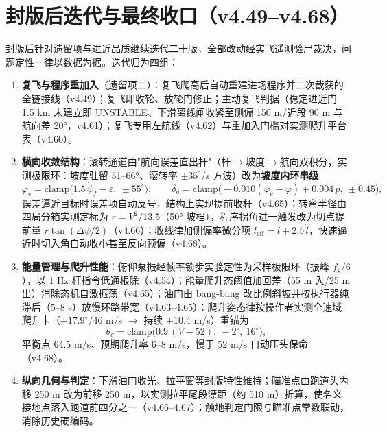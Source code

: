 \documentclass[12pt,UTF8,a4paper]{ctexart}
\begin{document}
\section{封版后迭代与最终收口（v4.49--v4.68）}
封版后针对遗留项与进近品质继续迭代二十版，全部改动经实飞遥测验尸裁决，问题定性一律以数据为据。迭代归为四组：
\begin{enumerate}
\item \textbf{复飞与程序重加入}（遗留项二）：复飞爬高后自动重建进场程序并二次截获的全链接线（v4.49）；复飞即收轮、放轮门修正；主动复飞判据（稳定进近门 1.5 km 未建立即 UNSTABLE、下滑离线闸收紧至侧偏 150 m/近段 90 m 与航向差 20°，v4.61）；复飞专用左航线（v4.62）与重加入门槛对实测爬升平台表（v4.60）。
\item \textbf{横向收敛结构}：滚转通道由"航向误差直出杆"（杆$\to$坡度$\to$航向双积分，实测极限环：坡度驻留 51--66°、滚转率 $\pm35^\circ$/s 方波）改为\textbf{坡度内环串级}
\begin{equation}
\varphi_c=\mathrm{clamp}\!\bigl(1.5\,\dot\psi_f-\varepsilon,\ \pm55^\circ\bigr),\qquad
\delta_a=\mathrm{clamp}\!\bigl(-0.010(\varphi_c-\varphi)+0.004\,p,\ \pm0.45\bigr),
\end{equation}
误差逼近目标时误差项自动反号，结构上实现提前收杆（v4.65）；转弯半径由四局分箱实测定标为 $r=V^2/13.5$（50° 坡档），程序拐角进一触发改为切点提前量 $r\tan(\Delta\psi/2)$（v4.66）；收线律加侧偏率微分项 $l_{\mathrm{eff}}=l+2.5\,\dot l$，快速逼近时切入角自动收小甚至反向预偏（v4.68）。
\item \textbf{能量管理与爬升性能}：俯仰泵振经帧率锁步实验定性为采样极限环（振峰 $f_s/6$），以 1 Hz 杆指令低通根除（v4.54）；能量爬升态阈值加回差（55 m 入/25 m 出）消除态机自激振荡（v4.65）；油门由 bang-bang 改比例斜坡并按执行器纯滞后（5--8 s）放慢环路带宽（v4.63--4.65）；爬升姿态律按操作者实测全速域爬升卡（$+17.9^\circ$/46 m/s $\to$ 持续 $+10.4$ m/s）重锚为
\begin{equation}
\theta_c=\mathrm{clamp}\!\bigl(0.9\,(V-52),\ -2^\circ,\ 16^\circ\bigr),
\end{equation}
平衡点 64.5 m/s、预期爬升率 6--8 m/s，慢于 52 m/s 自动压头保命（v4.68）。
\item \textbf{纵向几何与判定}：下滑油门收光、拉平窗等封版特性维持；瞄准点由跑道头内移 250 m 改为前移 250 m，以实测拉平尾段漂距（约 510 m）折算，使名义接地点落入跑道前四分之一（v4.66--4.67）；触地判定门限与瞄准点常数联动，消除历史硬编码。
\end{enumerate}
\end{document}

